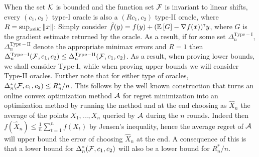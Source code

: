 When the set $\mathcal{K}$ is bounded and the function set $\mathcal{F}$ is invariant to linear shifts, every $(c_1,c_2)$ type-I oracle is also a $(R c_1,c_2)$ type-II oracle,
where $R = \sup_{x\in \mathcal{K}} \|x\|$: Simply consider $\tilde{f}(y) =  f(y) + (\mathbb{E}\left[G\right]-\nabla f(x))^\mathsf{\scriptscriptstyle T} y $,
where $G$ is the gradient estimate returned by the oracle.
As a result, if for some set $\Delta_{n}^{\mathrm{Type-I}}$, $\Delta_{n}^{\mathrm{Type-II}}$
denote the appropriate minimax errors and $R=1$
then $\Delta_{n}^{\mathrm{Type-I}}(\mathcal{F},c_1,c_2) \le \Delta_{n}^{\mathrm{Type-II}}(\mathcal{F}, c_1,c_2)  $.
As a result, when proving lower bounds, we shall consider Type-I, while when proving upper bounds we will consider Type-II oracles.
Further note that for either type of oracles, $\Delta_n^*(\mathcal{F},c_1,c_2) \le R_n^*/n$. This follows by the well known construction that turns an online convex optimization method $\mathcal{A}$ for regret minimization into an optimization method by running the method and at the end choosing as $\hat{X}_n$ the average of the points $X_1,\dots,X_n$ queried by $\mathcal{A}$ during the $n$ rounds.
Indeed then $f(\hat{X}_n) \le \frac1n \sum_{t=1}^n f(X_t)$ by Jensen's inequality, hence the average regret of $\mathcal{A}$ will upper bound the error of choosing $\hat{X}_n$ at the end.
A consequence of this is that a lower bound for $\Delta_n^*(\mathcal{F},c_1,c_2) $ will also be a lower bound for $R_n^*/n$.
